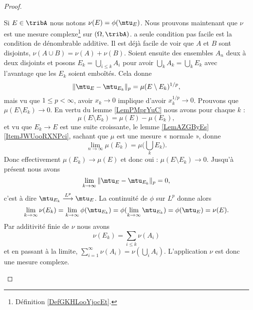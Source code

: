 \begin{proof}
\begin{subproof}
            Si \( E\in\tribA\) nous notons \( \nu(E)=\phi(\mtu_E)\). Nous prouvons maintenant que \( \nu\) est une mesure complexe\footnote{Définition \ref{DefGKHLooYjocEt}.} sur \( (\Omega,\tribA)\). a seule condition pas facile est la condition de dénombrable additive. Il est déjà facile de voir que \( A\) et \( B\) sont disjoints, \( \nu(A\cup B)=\nu(A)+\nu(B)\). Soient ensuite des ensembles \( A_n\) deux à deux disjoints et posons \( E_k=\bigcup_{i\leq k}A_i\) pour avoir \( \bigcup_kA_k=\bigcup_kE_k\) avec l'avantage que les \( E_k\) soient emboîtés. Cela donne
            \begin{equation}
                \| \mtu_E-\mtu_{E_k} \|_p=\mu(E\setminus E_k)^{1/p},
            \end{equation}
            mais vu que \( 1\leq p<\infty\), avoir \( x_k\to 0\) implique d'avoir \( x_k^{1/p}\to 0\). Prouvons que \( \mu(E\setminus E_k)\to 0\). En vertu du lemme \ref{LemPMprYuC} nous avons pour chaque \( k\) :
            \begin{equation}
                \mu(E\setminus E_k)=\mu(E)-\mu(E_k),
            \end{equation}
            et vu que \( E_k\to E\) est une suite croissante, le lemme \ref{LemAZGByEs}\ref{ItemJWUooRXNPci}, sachant que \( \mu\) est une mesure « normale », donne
            \begin{equation}
                \lim_{n\to \infty} \mu(E_k)=\mu\big( \bigcup_kE_k \big).
            \end{equation}
            Donc effectivement \( \mu(E_k)\to \mu(E)\) et donc oui : \( \mu(E\setminus E_k)\to 0\). Jusqu'à présent nous avons
            \begin{equation}
                \lim_{k\to \infty} \| \mtu_E-\mtu_{E_k} \|_p=0,
            \end{equation}
            c'est à dire \( \mtu_{E_k}\stackrel{L^p}{\longrightarrow}\mtu_E\). La continuité de \( \phi\) sur \( L^p\) donne alors
            \begin{equation}
                \lim_{k\to \infty} \nu(E_k)=\lim_{k\to \infty} \phi(\mtu_{E_k})=\phi(\lim_{k\to \infty} \mtu_{E_k})=\phi(\mtu_E)=\nu(E).
            \end{equation}
            Par additivité finie de \( \nu\) nous avons
            \begin{equation}
                \nu(E_k)=\sum_{i\leq k}\nu(A_i)
            \end{equation}
            et en passant à la limite, \( \sum_{i=1}^{\infty}\nu(A_i)=\nu(\bigcup_{i}A_i)\). L'application \( \nu\) est donc une mesure complexe.


\end{subproof}
\end{proof}
